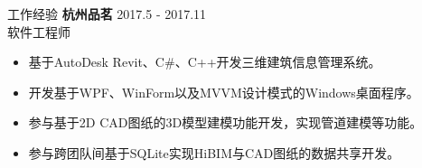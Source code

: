 \documentclass{resume} %
\begin{document}
\begin{rSection}{工作经验}
\textbf{杭州品茗} \hfill 2017.5 - 2017.11\\
软件工程师 \hfill \textit{}
\begin{itemize}
  \itemsep -3pt {}
  \item 基于AutoDesk Revit、C\#、C++开发三维建筑信息管理系统。
  \item 开发基于WPF、WinForm以及MVVM设计模式的Windows桌面程序。
  \item 参与基于2D CAD图纸的3D模型建模功能开发，实现管道建模等功能。
  \item 参与跨团队间基于SQLite实现HiBIM与CAD图纸的数据共享开发。
\end{itemize}

\end{rSection}

\end{document}
